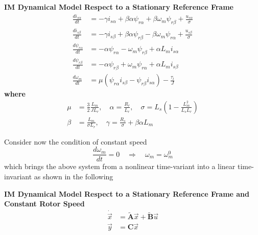 \documentclass[12pt,a4paper,oneside]{book}
\begin{document}
\begin{onehalfspace}
\begin{mybox}
	\textbf{IM Dynamical Model Respect to a Stationary Reference Frame}
	\begin{equation}\label{im_eq_33}
		\begin{aligned}
			\frac{di_{s\alpha}}{dt} &= -\gamma i_{s\alpha}  + 
			\beta\alpha\psi_{r\alpha}+\beta\omega_m\psi_{r\beta} + 
			\frac{u_{s\alpha}}{\sigma}\\[6pt]
			\frac{di_{s\beta}}{dt} &= -\gamma i_{s\beta}  + 
			\beta\alpha\psi_{r\beta}-\beta\omega_m\psi_{r\alpha} + 
			\frac{u_{s\beta}}{\sigma} \\[6pt]
			\frac{d\psi_{r\alpha}}{dt} &= -\alpha \psi_{r\alpha} 
			-\omega_m\psi_{r\beta}+\alpha L_m i_{s\alpha} \\[6pt]
			\frac{d\psi_{r\beta}}{dt} &= -\alpha \psi_{r\beta} 
			+\omega_m\psi_{r\alpha}+\alpha L_m i_{s\beta} \\[6pt]
			\frac{d\omega_m}{dt} &= \mu \left(\psi_{r\alpha}i_{s\beta} - 
			\psi_{r\beta}i_{s\alpha}\right)-\frac{\tau_l}{J}
		\end{aligned}
	\end{equation}
	\textbf{where}
	\begin{equation}\label{im_eq_34}
		\begin{aligned}
			\mu & = \frac{3}{2}\frac{L_m}{JL_r}, \quad
			\alpha = \frac{R_r}{L_r},  \quad
			\sigma = L_s \left(1-\frac{L_m^2}{L_sL_r}\right) \\[6pt]
			\beta & = \frac{L_m}{\sigma L_r},  \quad
			\gamma = \frac{R_s}{\sigma} + \beta \alpha L_m
		\end{aligned}
	\end{equation}
\end{mybox}
Consider now the condition of constant speed
\begin{equation}\label{im_eq_35}
	\frac{d\omega_m}{dt}=0 \quad\Rightarrow\quad\omega_m=\omega_m^0
\end{equation}
which brings the above system from a nonlinear time-variant into a linear 
time-invariant as shown in the following
\begin{mybox}
	\textbf{IM Dynamical Model Respect to a Stationary Reference Frame and 
		Constant Rotor Speed}
	\begin{equation}\label{im_eq_36}
		\begin{aligned}
			\dot{\vec{x}} &=\tilde{\mathbf{A}}\vec{x}+\tilde{\mathbf{B}}\vec{u} 
			\\[6pt]
			{\vec{y}} &={\mathbf{C}}\vec{x}
		\end{aligned}

\end{equation}
\end{mybox}
\end{onehalfspace}
\end{document}

